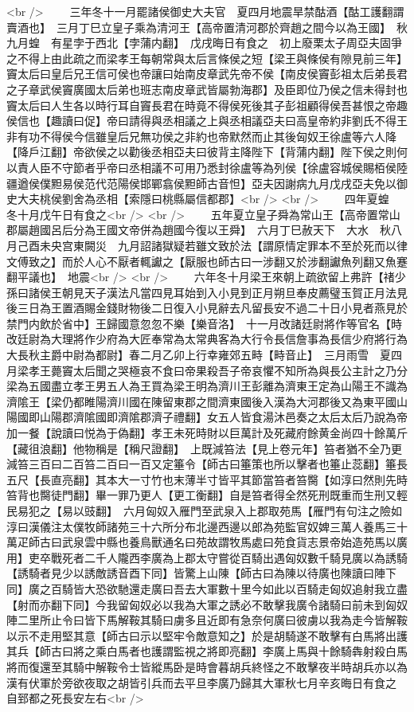 <br />
　　三年冬十一月罷諸侯御史大夫官　夏四月地震旱禁酤酒【酤工護翻謂賣酒也】　三月丁巳立皇子乘為清河王【高帝置清河郡於齊趙之間今以為王國】　秋九月蝗　有星孛于西北【孛蒲内翻】　戊戌晦日有食之　初上廢栗太子周亞夫固爭之不得上由此疏之而梁孝王每朝常與太后言條侯之短【梁王與條侯有隙見前三年】竇太后曰皇后兄王信可侯也帝讓曰始南皮章武先帝不侯【南皮侯竇彭祖太后弟長君之子章武侯竇廣國太后弟也班志南皮章武皆屬勃海郡】及臣即位乃侯之信未得封也竇太后曰人生各以時行耳自竇長君在時竟不得侯死後其子彭祖顧得侯吾甚恨之帝趣侯信也【趣讀曰促】帝曰請得與丞相議之上與丞相議亞夫曰高皇帝約非劉氏不得王非有功不得侯今信雖皇后兄無功侯之非約也帝默然而止其後匈奴王徐盧等六人降【降戶江翻】帝欲侯之以勸後丞相亞夫曰彼背主降陛下【背蒲内翻】陛下侯之則何以責人臣不守節者乎帝曰丞相議不可用乃悉封徐盧等為列侯【徐盧容城侯賜栢侯陸疆遒侯僕䵣易侯范代范陽侯邯鄲翕侯䵣師古音怛】亞夫因謝病九月戊戌亞夫免以御史大夫桃侯劉舍為丞相【索隱曰桃縣屬信都郡】<br />
<br />
　　四年夏蝗　冬十月戊午日有食之<br />
<br />
　　五年夏立皇子舜為常山王【高帝置常山郡屬趙國呂后分為王國文帝併為趙國今復以王舜】　六月丁巳赦天下　大水　秋八月己酉未央宫東闕災　九月詔諸獄疑若雖文致於法【謂原情定罪本不至於死而以律文傅致之】而於人心不厭者輒讞之【厭服也師古曰一涉翻又於涉翻讞魚列翻又魚蹇翻平議也】　地震<br />
<br />
　　六年冬十月梁王來朝上疏欲留上弗許【禇少孫曰諸侯王朝見天子漢法凡當四見耳始到入小見到正月朔旦奉皮薦璧玉賀正月法見後三日為王置酒賜金錢財物後二日復入小見辭去凡留長安不過二十日小見者燕見於禁門内飲於省中】王歸國意忽忽不樂【樂音洛】　十一月改諸廷尉將作等官名【時改廷尉為大理將作少府為大匠奉常為太常典客為大行令長信詹事為長信少府將行為大長秋主爵中尉為都尉】春二月乙卯上行幸雍郊五畤【畤音止】　三月雨雪　夏四月梁孝王薨竇太后聞之哭極哀不食曰帝果殺吾子帝哀懼不知所為與長公主計之乃分梁為五國盡立孝王男五人為王買為梁王明為濟川王彭離為濟東王定為山陽王不識為濟隂王【梁仍都睢陽濟川國在陳留東郡之間濟東國後入漢為大河郡後又為東平國山陽國即山陽郡濟隂國即濟隂郡濟子禮翻】女五人皆食湯沐邑奏之太后太后乃說為帝加一餐【說讀曰悦為于偽翻】孝王未死時財以巨萬計及死藏府餘黄金尚四十餘萬斤【藏徂浪翻】他物稱是【稱尺證翻】　上既減笞法【見上卷元年】笞者猶不全乃更減笞三百曰二百笞二百曰一百又定箠令【師古曰箠策也所以擊者也箠止蕊翻】箠長五尺【長直亮翻】其本大一寸竹也末薄半寸皆平其節當笞者笞臋【如淳曰然則先時笞背也臋徒門翻】畢一罪乃更人【更工衡翻】自是笞者得全然死刑既重而生刑又輕民易犯之【易以豉翻】　六月匈奴入雁門至武泉入上郡取苑馬【雁門有句注之險如淳曰漢儀注太僕牧師諸苑三十六所分布北邊西邊以郎為苑監官奴婢三萬人養馬三十萬疋師古曰武泉雲中縣也養鳥獸通名曰苑故謂牧馬處曰苑食貨志景帝始造苑馬以廣用】吏卒戰死者二千人隴西李廣為上郡太守嘗從百騎出遇匈奴數千騎見廣以為誘騎【誘騎者見少以誘敵誘音酉下同】皆驚上山陳【師古曰為陳以待廣也陳讀曰陣下同】廣之百騎皆大恐欲馳還走廣曰吾去大軍數十里今如此以百騎走匈奴追射我立盡【射而亦翻下同】今我留匈奴必以我為大軍之誘必不敢擊我廣令諸騎曰前未到匈奴陣二里所止令曰皆下馬解鞍其騎曰虜多且近即有急奈何廣曰彼虜以我為走今皆解鞍以示不走用堅其意【師古曰示以堅牢令敵意知之】於是胡騎遂不敢擊有白馬將出護其兵【師古曰將之乘白馬者也護謂監視之將即亮翻】李廣上馬與十餘騎犇射殺白馬將而復還至其騎中解鞍令士皆縱馬卧是時會暮胡兵終怪之不敢擊夜半時胡兵亦以為漢有伏軍於旁欲夜取之胡皆引兵而去平旦李廣乃歸其大軍秋七月辛亥晦日有食之　自郅都之死長安左右<br />
